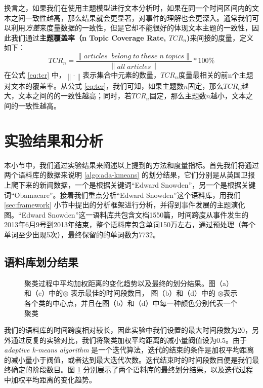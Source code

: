 换言之，如果我们在使用主题模型进行文本分析时，如果在同一个时间区间内的文本之间一致性越高，那么结果就会更显著，对事件的理解也会更深入。通常我们可以利用\emph{方差}来度量数据的一致性，但是它却不能很好的体现文本主题的一致性，因此我们通过\textbf{主题覆盖率（n Topic Coverage Rate, $TCR_n$)}来间接的度量，定义如下：
\begin{equation}
\label{eq:tcr}
TCR_n = \frac{\left \| articles\;\;belong\;to\;these\;n\;topics \right \|}{\left \| all\;articles \right \|} * 100\%
\end{equation}
在公式 \ref{eq:tcr} 中，$\left \| \cdot \right \|$表示集合中元素的数量，$TCR_n$度量最相关的前n个主题对文本的覆盖率。从公式 \ref{eq:tcr}，我们可知，如果主题数$n$固定，那么$TCR_n$越大，文本之间的的一致性越高；同时，若$TCR_n$固定，那么主题数$n$越小，文本之间的一致性越高。


\section{实验结果和分析}
本小节中，我们通过实验结果来阐述以上提到的方法和度量指标。首先我们将通过两个语料库的数据来说明 \ref{algo:ada-kmeans} 的划分结果，它们分别是从英国卫报上爬下来的新闻数据，一个是根据关键词“Edward Snowden”，另一个是根据关键词“Obamacare”。接着我们重点分析“Edward Snowden”这个语料库，用我们 \ref{sec:framework} 小节中提出的分析框架进行分析，并得到事件发展的主题演化图。“Edward Snowden”这一语料库共包含文档1550篇，时间跨度从事件发生的2013年6月9号到2013年结束，整个语料库包含单词150万左右，通过预处理（每个单词至少出现5次），最终保留的的单词数为7732。
\subsection{语料库划分结果}
\label{sec:ada-kmeans-result}
\begin{figure}[htb]
	\centering

	\caption{聚类过程中平均加权距离的变化趋势以及最终的划分结果。图（a）和（c）中的$\otimes$ 表示最佳的时间段数目， 图（b）和（d）中的 $\otimes$表示各个类的中心点，并且在图（b）和（d）中每一种颜色分别代表一个聚类}
	\label{fig:cluster}
\end{figure}
我们的语料库的时间跨度相对较长，因此实验中我们设置的最大时间段数为20，另外通过反复的实验对比，我们将聚类加权平均距离的减小量阀值设为0.5。由于 \emph{adaptive k-means algorithm} 是一个迭代算法，迭代的结束的条件是加权平均距离的减小量小于阀值，或者达到最大迭代次数。迭代结束时的时间段数目便是我们最终确定的阶段数目。图 \ref{fig:cluster} 分别展示了两个语料库的最终划分结果，以及迭代过程中加权平均距离的变化趋势。

